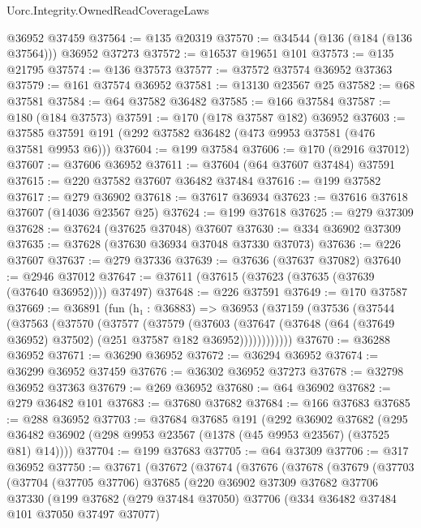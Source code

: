 \begin{lexlean}{Uorc.Integrity.OwnedReadCoverageLaws}
\begin{coremodule}
    @36952
    @37459
@37564 := @135 @20319
@37570 := @34544 (@136 (@184 (@136 @37564))) @36952 @37273
@37572 := @16537 @19651 @101
@37573 := @135 @21795
@37574 := @136 @37573
@37577 := @37572 @37574 @36952 @37363
@37579 := @161 @37574 @36952
@37581 := @13130 @23567 @25
@37582 := @68 @37581
@37584 := @64 @37582 @36482
@37585 := @166 @37584
@37587 := @180 (@184 @37573)
@37591 := @170 (@178 @37587 @182) @36952
@37603 := @37585 @37591 @191 (@292 @37582 @36482 (@473 @9953 @37581 (@476 @37581 @9953 @6)))
@37604 := @199 @37584
@37606 := @170 (@2916 @37012)
@37607 := @37606 @36952
@37611 := @37604 (@64 @37607 @37484) @37591
@37615 := @220 @37582 @37607 @36482 @37484
@37616 := @199 @37582
@37617 := @279 @36902
@37618 := @37617 @36934
@37623 := @37616 @37618 @37607 (@14036 @23567 @25)
@37624 := @199 @37618
@37625 := @279 @37309
@37628 := @37624 (@37625 @37048) @37607
@37630 := @334 @36902 @37309
@37635 := @37628 (@37630 @36934 @37048 @37330 @37073)
@37636 := @226 @37607
@37637 := @279 @37336
@37639 := @37636 (@37637 @37082)
@37640 := @2946 @37012
@37647 := @37611 (@37615 (@37623 (@37635 (@37639 (@37640 @36952)))) @37497)
@37648 := @226 @37591
@37649 := @170 @37587
@37669 := @36891
    (fun (h₁ : @36883) =>
    @36953
      (@37159
        (@37536
          (@37544
            (@37563
              (@37570
                (@37577
                  (@37579
                    (@37603
                      (@37647
                        (@37648 (@64 (@37649 @36952) @37502) (@251 @37587 @182 @36952))))))))))))
@37670 := @36288 @36952
@37671 := @36290 @36952
@37672 := @36294 @36952
@37674 := @36299 @36952 @37459
@37676 := @36302 @36952 @37273
@37678 := @32798 @36952 @37363
@37679 := @269 @36952
@37680 := @64 @36902
@37682 := @279 @36482 @101
@37683 := @37680 @37682
@37684 := @166 @37683
@37685 := @288 @36952
@37703 := @37684
    @37685
    @191
    (@292
      @36902
      @37682
      (@295 @36482 @36902 (@298 @9953 @23567 (@1378 (@45 @9953 @23567) (@37525 @81) @14))))
@37704 := @199 @37683
@37705 := @64 @37309
@37706 := @317 @36952
@37750 := @37671
    (@37672
      (@37674
        (@37676
          (@37678
            (@37679
              (@37703
                (@37704
                  (@37705 @37706)
                  @37685
                  (@220
                    @36902
                    @37309
                    @37682
                    @37706
                    @37330
                    (@199
                      @37682
                      (@279 @37484 @37050)
                      @37706
                      (@334 @36482 @37484 @101 @37050 @37497 @37077)

\end{coremodule}
\end{lexlean}
